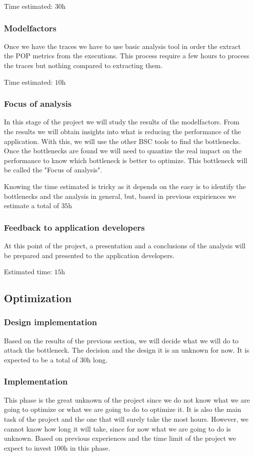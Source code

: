 Time estimated: $\si{30\hour}$

\subsubsection{Modelfactors}
Once we have the traces we have to use basic analysis tool in order the extract the POP metrics from the executions. This process require a few hours to process the traces but nothing compared to extracting them.

Time estimated: $\si{10\hour}$

\subsubsection{Focus of analysis}
In this stage of the project we will study the results of the modelfactors. From the results we will obtain insights into what is reducing the performance of the application. With this, we will use the other BSC tools to find the bottlenecks. Once the bottlenecks are found we will need to quantize the real impact on the performance to know which bottleneck is better to optimize. This bottleneck will be called the "Focus of analysis".

Knowing the time estimated is tricky as it depends on the easy is to identify the bottlenecks and the analysis in general, but, based in previous expiriences we estimate a total of $\si{35\hour}$

\subsubsection{Feedback to application developers}
At this point of the project, a presentation and a conclusions of the analysis will be prepared and presented to the application developers.

Estimated time: $\si{15\hour}$

\subsection{Optimization}
\subsubsection{Design implementation}
Based on the results of the previous section, we will decide what we will do to attack the bottleneck. The decision and the design it is an unknown for now. It is expected to be a total of $\si{30\hour}$ long.

\subsubsection{Implementation}
This phase is the great unknown of the project since we do not know what we are going to optimize or what we are going to do to optimize it. It is also the main task of the project and the one that will surely take the most hours. However, we cannot know how long it will take, since for now what we are going to do is unknown. Based on previous experiences and the time limit of the project we expect to invest $\si{100\hour}$ in this phase.

